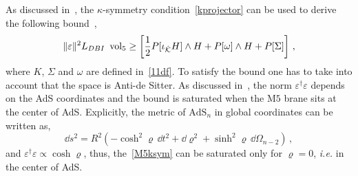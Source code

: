\documentclass[debug]{phd}
\begin{document}
	As discussed in~\cite{MS03, Gabella:2012rc}, the $\kappa$-symmetry condition~\eqref{kprojector} can be used to derive the following bound~\cite{Barwald:1999hx},
		\begin{equation}
		\label{M5ksym}
			\lVert \varepsilon \rVert^2 L_{DBI}\ \operatorname{vol}_5 \geq \left[ \frac{1}{2} P[ \iota_{\hat{\mathcal{K}}} H ] \wedge H + P[\omega] \wedge H + P[ \Sigma] \right]\, ,
		\end{equation}
	where $K$, $\Sigma$ and $\omega$ are defined in~\eqref{11df}.
	To satisfy the bound one has to take into account that the space is Anti-de Sitter. 
	As discussed in~\cite{Gabella:2012rc}, the norm $\varepsilon^\dagger \varepsilon$ depends on the AdS coordinates and the bound is saturated when the $\mathrm{M}5$ brane sits at the center of AdS.
	Explicitly, the metric of $\mathrm{AdS}_n$ in global coordinates can be written as,
		\begin{equation}
			\dd  s^2 = R^2\left(-\cosh^2 \varrho\, \dd  t^2 + \dd  \varrho^2 + \sinh^2 \varrho\, \dd  \Omega_{n-2} \right)\, ,
		\end{equation}
	and $\varepsilon^\dagger \varepsilon \propto \cosh \varrho$, thus, the~\eqref{M5ksym} can be saturated only for $\varrho = 0$, \emph{i.e.} in the center of AdS.
\end{document}
